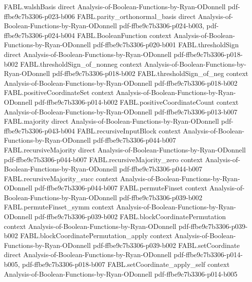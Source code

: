 \begin{theorem}
\proofstep
  {FABL.walshBasis}
  {direct}
  {Analysis-of-Boolean-Functions-by-Ryan-ODonnell}
  {pdf-ffbe9c7b3306-p023-b006}
\proofstep
  {FABL.parity_orthonormal_basis}
  {direct}
  {Analysis-of-Boolean-Functions-by-Ryan-ODonnell}
  {pdf-ffbe9c7b3306-p024-b003,
    pdf-ffbe9c7b3306-p024-b004}
\proofstep
  {FABL.BooleanFunction}
  {context}
  {Analysis-of-Boolean-Functions-by-Ryan-ODonnell}
  {pdf-ffbe9c7b3306-p020-b001}
\proofstep
  {FABL.thresholdSign}
  {direct}
  {Analysis-of-Boolean-Functions-by-Ryan-ODonnell}
  {pdf-ffbe9c7b3306-p018-b002}
\proofstep
  {FABL.thresholdSign_of_nonneg}
  {context}
  {Analysis-of-Boolean-Functions-by-Ryan-ODonnell}
  {pdf-ffbe9c7b3306-p018-b002}
\proofstep
  {FABL.thresholdSign_of_neg}
  {context}
  {Analysis-of-Boolean-Functions-by-Ryan-ODonnell}
  {pdf-ffbe9c7b3306-p018-b002}
\proofstep
  {FABL.positiveCoordinateSet}
  {context}
  {Analysis-of-Boolean-Functions-by-Ryan-ODonnell}
  {pdf-ffbe9c7b3306-p014-b002}
\proofstep
  {FABL.positiveCoordinateCount}
  {context}
  {Analysis-of-Boolean-Functions-by-Ryan-ODonnell}
  {pdf-ffbe9c7b3306-p013-b007}
\proofstep
  {FABL.majority}
  {direct}
  {Analysis-of-Boolean-Functions-by-Ryan-ODonnell}
  {pdf-ffbe9c7b3306-p043-b004}
\proofstep
  {FABL.recursiveInputBlock}
  {context}
  {Analysis-of-Boolean-Functions-by-Ryan-ODonnell}
  {pdf-ffbe9c7b3306-p044-b007}
\proofstep
  {FABL.recursiveMajority}
  {direct}
  {Analysis-of-Boolean-Functions-by-Ryan-ODonnell}
  {pdf-ffbe9c7b3306-p044-b007}
\proofstep
  {FABL.recursiveMajority_zero}
  {context}
  {Analysis-of-Boolean-Functions-by-Ryan-ODonnell}
  {pdf-ffbe9c7b3306-p044-b007}
\proofstep
  {FABL.recursiveMajority_succ}
  {context}
  {Analysis-of-Boolean-Functions-by-Ryan-ODonnell}
  {pdf-ffbe9c7b3306-p044-b007}
\proofstep
  {FABL.permuteFinset}
  {context}
  {Analysis-of-Boolean-Functions-by-Ryan-ODonnell}
  {pdf-ffbe9c7b3306-p039-b002}
\proofstep
  {FABL.permuteFinset_symm}
  {context}
  {Analysis-of-Boolean-Functions-by-Ryan-ODonnell}
  {pdf-ffbe9c7b3306-p039-b002}
\proofstep
  {FABL.blockCoordinatePermutation}
  {context}
  {Analysis-of-Boolean-Functions-by-Ryan-ODonnell}
  {pdf-ffbe9c7b3306-p039-b002}
\proofstep
  {FABL.blockCoordinatePermutation_apply}
  {context}
  {Analysis-of-Boolean-Functions-by-Ryan-ODonnell}
  {pdf-ffbe9c7b3306-p039-b002}
\proofstep
  {FABL.setCoordinate}
  {direct}
  {Analysis-of-Boolean-Functions-by-Ryan-ODonnell}
  {pdf-ffbe9c7b3306-p014-b005,
    pdf-ffbe9c7b3306-p018-b007}
\proofstep
  {FABL.setCoordinate_apply_self}
  {context}
  {Analysis-of-Boolean-Functions-by-Ryan-ODonnell}
  {pdf-ffbe9c7b3306-p014-b005}

\end{theorem}
